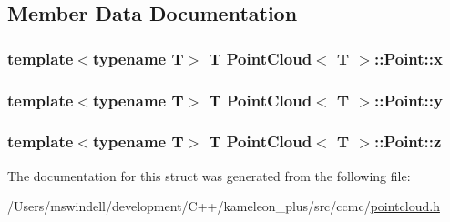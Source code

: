 \subsection{Member Data Documentation}
\hypertarget{struct_point_cloud_1_1_point_a4c9755e331a4b3c82f69bf73573a85cb}{
\subsubsection[{x}]{\setlength{\rightskip}{0pt plus 5cm}template$<$typename T$>$ T {\bf Point\-Cloud}$<$ T $>$\-::Point\-::x}}\label{struct_point_cloud_1_1_point_a4c9755e331a4b3c82f69bf73573a85cb}
\hypertarget{struct_point_cloud_1_1_point_a04e6140b52712a7fcabdb3b8d06040fc}{
\subsubsection[{y}]{\setlength{\rightskip}{0pt plus 5cm}template$<$typename T$>$ T {\bf Point\-Cloud}$<$ T $>$\-::Point\-::y}}\label{struct_point_cloud_1_1_point_a04e6140b52712a7fcabdb3b8d06040fc}
\hypertarget{struct_point_cloud_1_1_point_a606a44d077bc9f483cf6ff58c4896a14}{
\subsubsection[{z}]{\setlength{\rightskip}{0pt plus 5cm}template$<$typename T$>$ T {\bf Point\-Cloud}$<$ T $>$\-::Point\-::z}}\label{struct_point_cloud_1_1_point_a606a44d077bc9f483cf6ff58c4896a14}


The documentation for this struct was generated from the following file\-:\begin{DoxyCompactItemize}
\item 
/\-Users/mswindell/development/\-C++/kameleon\-\_\-plus/src/ccmc/\hyperlink{pointcloud_8h}{pointcloud.\-h}\end{DoxyCompactItemize}
